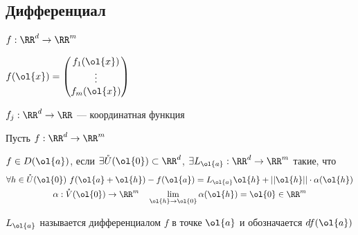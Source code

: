 \subsection{Дифференциал}

\( f : \RR^d \to \RR^m \)

\(
    f(\ol{x}) = \begin{pmatrix}
        f_1 (\ol{x})
        \\
        \vdots
        \\
        f_m (\ol{x})
    \end{pmatrix}
\)

\(
    f_j : \RR^d \to \RR
\) --- координатная функция

\begin{defn}{}{}
    Пусть \( f : \RR^d \to \RR^m \)

    \( f \in D(\ol{a}) \),
    если \( \exists \mathring{U}(\ol{0}) \subset \RR^d \),
    \( \exists L_{\ol{a}} : \RR^d \to \RR^m \) такие,
    что
    \begin{gather*}
        \forall h \in \mathring{U}(\ol{0}) \
            f(\ol{a} + \ol{h}) - f(\ol{a}) = L_{\ol{a}} \ol{h} + || \ol{h} || \cdot \alpha(\ol{h})
        \\
        \alpha : \mathring{V}(\ol{0}) \to \RR^m \quad \lim\limits_{\ol{h} \to \ol{0}} \alpha(\ol{h}) = \ol{0} \in \RR^m
    \end{gather*}

    \( L_{\ol{a}} \) называется дифференциалом \( f \) в точке \( \ol{a} \) и обозначается \( df(\ol{a}) \)
\end{defn}

